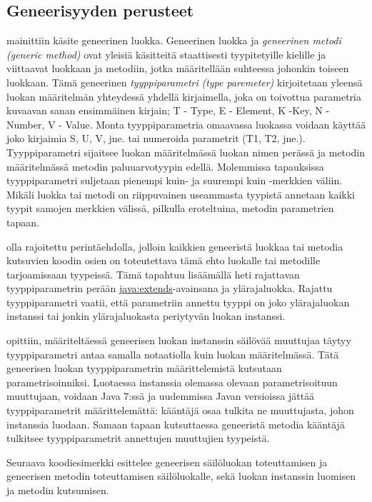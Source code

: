 \documentclass[a4paper,justified,notoc]{tufte-book}
\newcommand{\eng}[1]{\textit{(#1)}}
\newcommand{\new}[1]{\textit{\gls{#1}}}
\newcommand{\neweng}[2]{\new{#1} \eng{#2}}
\newcommand{\java}[1]{\underline{\gls{java:#1}}}
\begin{document}
\begin{fullwidth}
\subsection{Geneerisyyden perusteet}
\label{genericBasics}

  mainittiin käsite \gls{geneerinen luokka}. 
Geneerinen luokka ja \neweng{geneerinen metodi}{generic method} ovat yleisiä käsitteitä
staattisesti tyypitetyille kielille ja viittaavat luokkaan ja metodiin, jotka määritellään
suhteessa johonkin toiseen luokkaan. Tämä geneerinen \neweng{tyyppiparametri}{type paremeter}
kirjoitetaan yleensä luokan määritelmän yhteydessä yhdellä kirjaimella, joka on toivottua
parametria kuvaavan sanan ensimmäinen kirjain; T - Type, E - Element, K -Key, N - Number, V -
Value. Monta tyyppiparametria omaavassa luokassa voidaan käyttää joko kirjaimia S, U, V, jne. tai
numeroida parametrit (T1, T2, jne.). Tyyppiparametri sijaitsee luokan määritelmässä luokan nimen
perässä ja metodin määritelmässä metodin paluuarvotyypin edellä. Molemmissa tapauksissa
tyyppiparametri suljetaan pienempi kuin- ja suurempi kuin -merkkien väliin. Mikäli luokka tai
metodi on riippuvainen useammasta tyypistä annetaan kaikki tyypit samojen merkkien välissä,
pilkulla eroteltuina, metodin parametrien tapaan. 

 olla rajoitettu perintäehdolla, jolloin kaikkien
geneeristä luokkaa tai metodia kutsuvien koodin osien on toteutettava tämä ehto luokalle tai
metodille tarjoamissaan tyypeissä. Tämä tapahtuu lisäämällä heti rajattavan tyyppiparametrin
perään \java{extends}-avainsana ja ylärajaluokka. Rajattu tyyppiparametri vaatii, että parametriin
annettu tyyppi on joko ylärajaluokan instanssi tai jonkin ylärajaluokasta periytyvän luokan
instanssi.

  opittiin, määriteltäessä geneerisen luokan
instanssin säilövää muuttujaa täytyy tyyppiparametri antaa samalla notaatiolla kuin luokan
määritelmässä. Tätä geneerisen luokan tyyppiparametrin määrittelemistä kutsutaan
parametrisoinniksi. Luotaessa instanssia olemassa olevaan parametrisoituun muuttujaan, voidaan
Java 7:ssä ja uudemmissa Javan versioissa jättää tyyppiparametrit määrittelemättä: kääntäjä osaa
tulkita ne muuttujasta, johon instanssia luodaan. Samaan tapaan kutsuttaessa geneeristä metodia
kääntäjä tulkitsee tyyppiparametrit annettujen muuttujien tyypeistä.

Seuraava koodiesimerkki esittelee
geneerisen säilöluokan toteuttamisen ja geneerisen metodin toteuttamisen säilöluokalle, sekä
luokan instanssin luomisen ja metodin kutsumisen.


\end{fullwidth}
\end{document}
